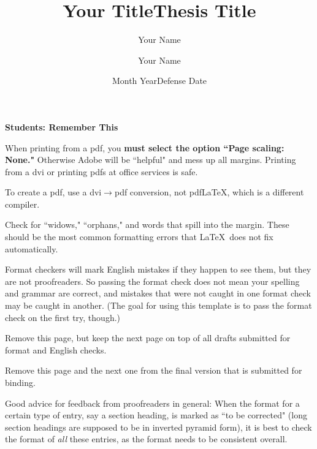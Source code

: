 \documentclass{LA_Tech}
\title{Your Title}
\author{Your Name}
\date{Month Year}
\title{Thesis Title}
\author{Your Name}
\date{Defense Date}
\renewenvironment{itemize}{%
\vspace{-.15in} %
    \begin{olditemize}%
\setlength{\parsep}{0ex}
\setlength{\topsep}{0ex}
\setlength{\partopsep}{0ex}
      \setlength{\parskip}{0pt}%
      \setlength{\itemsep}{0pt}%
  }%
  {%
    \end{olditemize}%
  }
\numberwithin{equation}{chapter}
\begin{document}
\thispagestyle{empty}


\begin{singlespace}

\centerline{\bf \Large Students: Remember This}



\begin{itemize}
\item
When printing from a pdf, you {\bf must select the option
``Page scaling: None."} Otherwise Adobe will be ``helpful" and
mess up all margins. Printing from a dvi or printing pdfs
at office services is safe.

\item
To create a pdf, use a dvi$\to $pdf conversion, not pdf\LaTeX, which is a
different compiler.


\item
Check for ``widows," ``orphans," and words that spill into the margin.
These should be the most common formatting errors that \LaTeX \
does not fix automatically.

\item
Format checkers will mark English mistakes if they happen to see them,
but they are not proofreaders. So passing the format check does not
mean your spelling and grammar are correct, and mistakes that were
not caught in one format check may be caught in another.
(The goal for using this template is to
pass the format check on the first try, though.)

\item
Remove this page, but keep the next
page on top of all drafts submitted for
format and English checks.

\item
Remove this page and the next one from the final version
that is submitted for binding.


\end{itemize}


Good advice for feedback from proofreaders in general:
When the format for a certain type of entry, say a section heading,
is marked as ``to be corrected" (long section headings are supposed
to be in inverted pyramid form), it is best to
check the format of {\em all} these entries, as
the format needs to be
consistent overall.


\end{singlespace}




\clearpage

\thispagestyle{empty}
\end{document}
